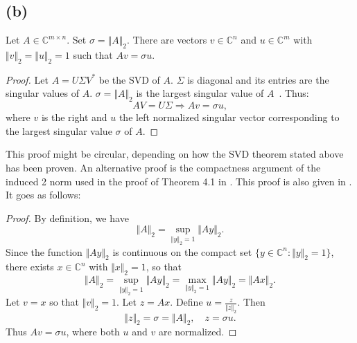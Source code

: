 \documentclass[a4paper, 11pt]{article}
\begin{document}
\subsection*{(b)}
Let $A \in \mathbb{C}^{m\times n}$. Set $\sigma = \Vert A\Vert_2$. There are
vectors $v \in \mathbb{C}^{n}$ and $u \in \mathbb{C}^m$ with $\Vert v\Vert_2 =
\Vert u\Vert_2 = 1$ such that $Av=\sigma u$.
\begin{proof}
  Let $A = U\Sigma V^*$ be the SVD of $A$. $\Sigma$ is diagonal and its entries
  are the singular values of $A$. $\sigma = \Vert A\Vert_2$ is the largest
  singular value of $A$~\cite[Theorem 5.3]{tb}. Thus:
  \begin{equation}
    AV = U\Sigma \Rightarrow Av = \sigma u,
  \end{equation}
  where $v$ is the right and $u$ the left normalized singular vector
  corresponding to the largest singular value $\sigma$ of $A$.
\end{proof}
This proof might be circular, depending on how the SVD theorem stated above has
been proven. An alternative proof is the compactness argument of the induced 2
norm used in the proof of Theorem 4.1 in \cite{tb}. This proof is also
given in \cite{slides}. It goes as follows:

\begin{proof}
  By definition, we have
  \begin{equation*}
    \Vert A \Vert_2 = \sup_{\Vert y\Vert_2 = 1} \Vert Ay \Vert_2.
  \end{equation*}
  Since the function $\Vert Ay \Vert_2$ is continuous on the compact set $\{y
  \in \mathbb{C}^n : \Vert y\Vert_2 = 1\}$, there exists $x \in \mathbb{C}^n$
  with $\Vert x\Vert_2 = 1$, so that
  \begin{equation*}
    \Vert A \Vert_2 = \sup_{\Vert y\Vert_2 = 1} \Vert Ay\Vert_2 = \max_{\Vert
    y\Vert_2 = 1} \Vert Ay\Vert_2 = \Vert Ax\Vert_2.
  \end{equation*}
  Let $v = x$ so that $\Vert v\Vert_2 = 1$. Let $z = Ax$. Define $u =
  \frac{z}{\Vert z\Vert_2}$. Then
  \begin{equation*}
    \Vert z\Vert_2 = \sigma = \Vert A\Vert_2, \quad z = \sigma u.
  \end{equation*}
  Thus $Av = \sigma u$, where both $u$ and $v$ are normalized. 
\end{proof}
\end{document}
